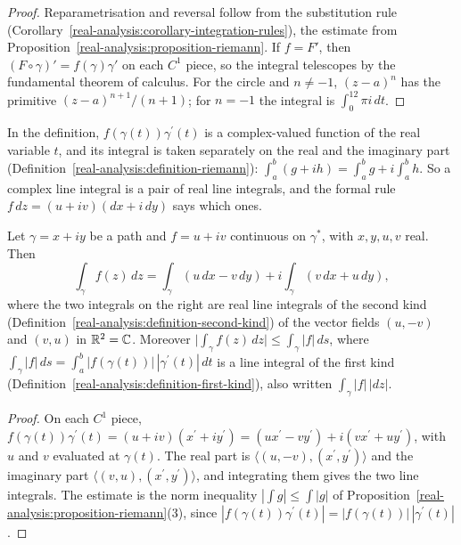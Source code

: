 \begin{proof}
Reparametrisation and reversal follow from the substitution rule (Corollary~\ref{real-analysis:corollary-integration-rules}), the estimate from
Proposition~\ref{real-analysis:proposition-riemann}. If $f = F'$, then $(F \circ \gamma)' = f(\gamma)\gamma'$ on each $C^1$ piece, so the integral telescopes by the fundamental theorem of calculus. For the
circle and $n \neq -1$, $(z - a)^n$ has the primitive $(z - a)^{n+1}/(n + 1)$; for $n = -1$ the integral is $\int_0^12\pi i\,dt$.
\end{proof}

In the definition, $f(\gamma(t))\gamma^{\prime}(t)$ is a complex-valued function of the real variable $t$, and its integral is taken separately on the real and the imaginary part
(Definition~\ref{real-analysis:definition-riemann}): $\int_a^b(g + ih) = \int_a^bg + i\int_a^bh$. So a complex line integral is a pair of real line integrals, and the formal rule
$f\,dz = (u + iv)(dx + i\,dy)$ says which ones.

\begin{proposition}\label{complex-analysis:proposition-path-integral-real}
Let $\gamma = x + iy$ be a path and $f = u + iv$ continuous on $\gamma^*$, with $x, y, u, v$ real. Then
\[
\int_\gamma f(z)\,dz = \int_\gamma(u\,dx - v\,dy) + i\int_\gamma(v\,dx + u\,dy),
\]
where the two integrals on the right are real line integrals of the second kind (Definition~\ref{real-analysis:definition-second-kind}) of the vector fields $(u, -v)$ and $(v, u)$ in $\mathbb{R}^2 = \mathbb{C}$. Moreover
$\bigl|\int_\gamma f(z)\,dz\bigr| \leq \int_\gamma|f|\,ds$, where $\int_\gamma|f|\,ds = \int_a^b|f(\gamma(t))|\,|\gamma^{\prime}(t)|\,dt$ is a line integral of the first kind
(Definition~\ref{real-analysis:definition-first-kind}), also written $\int_\gamma|f|\,|dz|$.
\end{proposition}

\begin{proof}
On each $C^1$ piece, $f(\gamma(t))\gamma^{\prime}(t) = (u + iv)(x^{\prime} + iy^{\prime}) = (ux^{\prime} - vy^{\prime}) + i(vx^{\prime} + uy^{\prime})$, with $u$ and $v$ evaluated at $\gamma(t)$. The real part is
$\langle(u, -v), (x^{\prime}, y^{\prime})\rangle$ and the imaginary part $\langle(v, u), (x^{\prime}, y^{\prime})\rangle$, and integrating them gives the two line integrals. The estimate is the norm inequality
$|\int g| \leq \int|g|$ of Proposition~\ref{real-analysis:proposition-riemann}(3), since $|f(\gamma(t))\gamma^{\prime}(t)| = |f(\gamma(t))|\,|\gamma^{\prime}(t)|$.
\end{proof}

